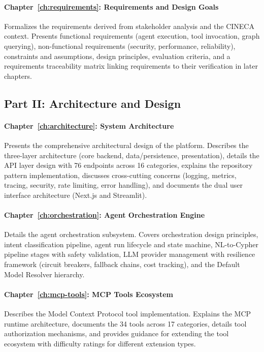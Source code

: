 \documentclass[a4paper,twoside]{sapthesis}
\begin{document}
\paragraph{Chapter~\ref{ch:requirements}: Requirements and Design Goals}
Formalizes the requirements derived from stakeholder analysis and the CINECA context. Presents functional requirements (agent execution, tool invocation, graph querying), non-functional requirements (security, performance, reliability), constraints and assumptions, design principles, evaluation criteria, and a requirements traceability matrix linking requirements to their verification in later chapters.

\subsection{Part II: Architecture and Design}

\paragraph{Chapter~\ref{ch:architecture}: System Architecture}
Presents the comprehensive architectural design of the platform. Describes the three-layer architecture (core backend, data/persistence, presentation), details the API layer design with 76 endpoints across 16 categories, explains the repository pattern implementation, discusses cross-cutting concerns (logging, metrics, tracing, security, rate limiting, error handling), and documents the dual user interface architecture (Next.js and Streamlit).

\paragraph{Chapter~\ref{ch:orchestration}: Agent Orchestration Engine}
Details the agent orchestration subsystem. Covers orchestration design principles, intent classification pipeline, agent run lifecycle and state machine, NL-to-Cypher pipeline stages with safety validation, LLM provider management with resilience framework (circuit breakers, fallback chains, cost tracking), and the Default Model Resolver hierarchy.

\paragraph{Chapter~\ref{ch:mcp-tools}: MCP Tools Ecosystem}
Describes the Model Context Protocol tool implementation. Explains the MCP runtime architecture, documents the 34 tools across 17 categories, details tool authorization mechanisms, and provides guidance for extending the tool ecosystem with difficulty ratings for different extension types.
\end{document}
